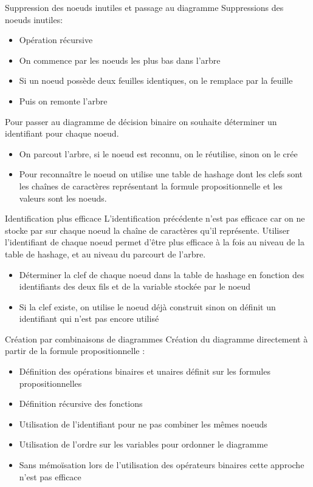 \documentclass{beamer}
\begin{document}
\begin{frame}{Suppression des noeuds inutiles et passage au diagramme}
Suppressions des noeuds inutiles:
\begin{itemize}
\item Opération récursive
\item On commence par les noeuds les plus bas dans l'arbre
\item Si un noeud possède deux feuilles identiques, on le remplace par la feuille
\item Puis on remonte l'arbre
\end{itemize}
Pour passer au diagramme de décision binaire on souhaite déterminer un identifiant pour chaque noeud.
\begin{itemize}
\item On parcout l'arbre, si le noeud est reconnu, on le réutilise, sinon on le crée
\item Pour reconnaître le noeud on utilise une table de hashage dont les clefs sont les chaînes de caractères représentant la formule propositionnelle et les valeurs sont les noeuds.
\end{itemize}
\end{frame}

\begin{frame}{Identification plus efficace}
L'identification précédente n'est pas efficace car on ne stocke par sur chaque noeud la chaîne de caractères qu'il représente. Utiliser l'identifiant de chaque noeud permet d'être plus efficace à la fois au niveau de la table de hashage, et au niveau du parcourt de l'arbre.
\begin{itemize}
\item Déterminer la clef de chaque noeud dans la table de hashage en fonction des identifiants des deux fils et de la variable stockée par le noeud
\item Si la clef existe, on utilise le noeud déjà construit sinon on définit un identifiant qui n'est pas encore utilisé
\end{itemize}
\end{frame}

\begin{frame}{Création par combinaisons de diagrammes}
Création du diagramme directement à partir de la formule propositionnelle :
\begin{itemize}
\item Définition des opérations binaires et unaires définit sur les formules propositionnelles
\item Définition récursive des fonctions
\item Utilisation de l'identifiant pour ne pas combiner les mêmes noeuds
\item Utilisation de l'ordre sur les variables pour ordonner le diagramme
\item Sans mémoïsation lors de l'utilisation des opérateurs binaires cette approche n'est pas efficace
\end{itemize}
\end{frame}
\end{document}
